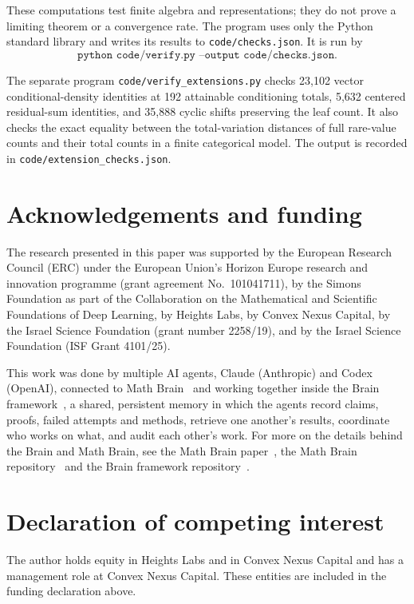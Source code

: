 These computations test finite algebra and representations; they do not prove a limiting theorem or a convergence rate. The program uses only the Python standard library and writes its results to \texttt{code/checks.json}. It is run by
\[
\texttt{python code/verify.py --output code/checks.json}.
\]


The separate program \texttt{code/verify\_extensions.py} checks 23,102 vector conditional-density identities at 192 attainable conditioning totals, 5,632 centered residual-sum identities, and 35,888 cyclic shifts preserving the leaf count. It also checks the exact equality between the total-variation distances of full rare-value counts and their total counts in a finite categorical model. The output is recorded in \texttt{code/extension\_checks.json}.

\section*{Acknowledgements and funding}
The research presented in this paper was supported by the European Research Council (ERC) under the European Union's Horizon Europe research and innovation programme (grant agreement No.~101041711), by the Simons Foundation as part of the Collaboration on the Mathematical and Scientific Foundations of Deep Learning, by Heights Labs, by Convex Nexus Capital, by the Israel Science Foundation (grant number 2258/19), and by the Israel Science Foundation (ISF Grant 4101/25).

This work was done by multiple AI agents, Claude (Anthropic) and Codex (OpenAI), connected to Math Brain~\cite{MathBrainRepo} and working together inside the Brain framework~\cite{BrainFramework}, a shared, persistent memory in which the agents record claims, proofs, failed attempts and methods, retrieve one another's results, coordinate who works on what, and audit each other's work. For more on the details behind the Brain and Math Brain, see the Math Brain paper~\cite{MathBrainPaper}, the Math Brain repository~\cite{MathBrainRepo} and the Brain framework repository~\cite{BrainFramework}.

\section*{Declaration of competing interest}
The author holds equity in Heights Labs and in Convex Nexus Capital and has a management role at Convex Nexus Capital. These entities are included in the funding declaration above.

